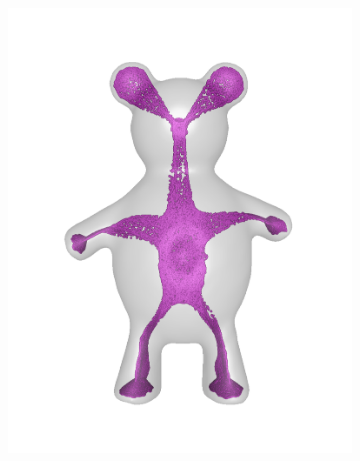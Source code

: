 \documentclass[annual]{acmsiggraph}
\begin{document}
\begin{figure}
        \centering
		\begin{subfigure}[b]{0.19\linewidth}
                \centering
                \includegraphics[width=\textwidth]{images/bear/0.pdf}
       \end{subfigure}
		~
		\begin{subfigure}[b]{0.19\linewidth}
                \centering

\end{subfigure}
\end{figure}
\end{document}
